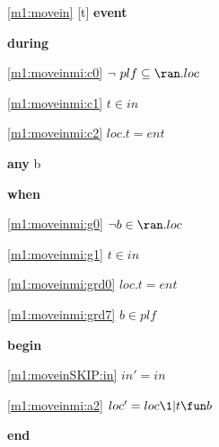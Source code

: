 \noindent \ref{m1:movein} [t] \textbf{event}
\begin{block}
\item \textbf{during}
\begin{block}
\item[ \eqref{m1:moveinmi:c0} ]$\neg ~ plf \subseteq \ran.loc $ %
\item[ \eqref{m1:moveinmi:c1} ]$t \in in $ %
\item[ \eqref{m1:moveinmi:c2} ]$loc.t = ent $ %
\end{block}
\item \textbf{any} b
\item \textbf{when}
\begin{block}
\item[ \eqref{m1:moveinmi:g0} ]$\neg b \in \ran.loc  	$ %
\item[ \eqref{m1:moveinmi:g1} ]$t \in in $ %
\item[ \eqref{m1:moveinmi:grd0} ]$loc.t = ent $ %
\item[ \eqref{m1:moveinmi:grd7} ]$b \in plf $ %
\end{block}
\item \textbf{begin}
\begin{block}
\item[ \eqref{m1:moveinSKIP:in} ]$in' = in$ %
\item[ \eqref{m1:moveinmi:a2} ]$loc' = loc \1| t \fun b $ %
\end{block}
\item \textbf{end} \\
\end{block}
